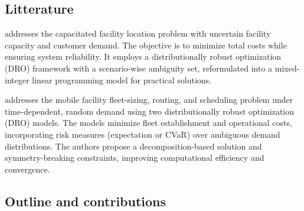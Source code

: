 \documentclass[12pt, letterpaper]{article}
\begin{document}
	\subsection*{Litterature}
	\cite{cheng_distributionally_2024} addresses the capacitated facility location problem with uncertain facility capacity and customer demand. The objective is to minimize total costs while ensuring system reliability. It employs a distributionally robust optimization (DRO) framework with a scenario-wise ambiguity set, reformulated into a mixed-integer linear programming model for practical solutions.

	\cite{shehadeh_distributionally_2023} addresses the mobile facility fleet-sizing, routing, and scheduling problem under time-dependent, random demand using two distributionally robust optimization (DRO) models. The models minimize fleet establishment and operational costs, incorporating risk measures (expectation or CVaR) over ambiguous demand distributions. The authors propose a decomposition-based solution and symmetry-breaking constraints, improving computational efficiency and convergence.
	
	\subsection*{Outline and contributions}
\end{document}

